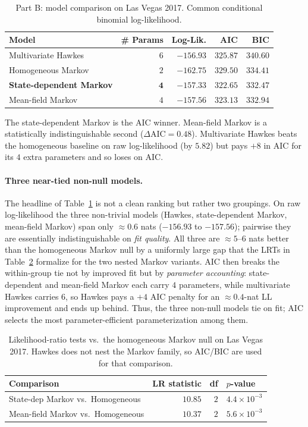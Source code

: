 \documentclass[11pt]{article}
\begin{document}
\begin{table}[H]
\centering
\caption{Part B: model comparison on Las Vegas 2017. Common conditional
binomial log-likelihood.}
\label{tab:partB-models}
\begin{tabular}{lrrrr}
\toprule
Model & \# Params & Log-Lik. & AIC & BIC \\
\midrule
Multivariate Hawkes        & $6$ & $-156.93$ & $325.87$ & $340.60$ \\
Homogeneous Markov         & $2$ & $-162.75$ & $329.50$ & $334.41$ \\
\textbf{State-dependent Markov} & $\mathbf{4}$ & $\mathbf{-157.33}$ & $\mathbf{322.65}$ & $\mathbf{332.47}$ \\
Mean-field Markov          & $4$ & $-157.56$ & $323.13$ & $332.94$ \\
\bottomrule
\end{tabular}
\end{table}

The state-dependent Markov is the AIC winner. Mean-field Markov is a
statistically indistinguishable second ($\Delta\mathrm{AIC}=0.48$).
Multivariate Hawkes beats the homogeneous baseline on raw log-likelihood
(by $5.82$) but pays $+8$ in AIC for its $4$ extra parameters and so loses
on AIC.

\paragraph{Three near-tied non-null models.}
The headline of Table~\ref{tab:partB-models} is not a clean ranking but
rather two groupings. On raw log-likelihood the three non-trivial models
(Hawkes, state-dependent Markov, mean-field Markov) span only
$\approx 0.6$ nats ($-156.93$ to $-157.56$); pairwise they are essentially
indistinguishable on \emph{fit quality}. All three are $\approx\!5\text{--}6$
nats better than the homogeneous Markov null by a uniformly large gap that
the LRTs in Table~\ref{tab:partB-LRT} formalize for the two nested Markov
variants. AIC then breaks the within-group tie not by improved fit but by
\emph{parameter accounting}: state-dependent and mean-field Markov each
carry $4$ parameters, while multivariate Hawkes carries $6$, so Hawkes pays
a $+4$ AIC penalty for an $\approx 0.4$-nat LL improvement and ends up
behind. Thus, the three non-null models tie on fit; AIC selects the most
parameter-efficient parameterization among them.

\begin{table}[H]
\centering
\caption{Likelihood-ratio tests vs.\ the homogeneous Markov null on
Las Vegas 2017. Hawkes does not nest the Markov family, so AIC/BIC are
used for that comparison.}
\label{tab:partB-LRT}
\begin{tabular}{lrrl}
\toprule
Comparison & LR statistic & df & $p$-value \\
\midrule
State-dep Markov vs.\ Homogeneous  & $10.85$ & $2$ & $4.4\times 10^{-3}$ \\
Mean-field Markov vs.\ Homogeneous & $10.37$ & $2$ & $5.6\times 10^{-3}$ \\
\bottomrule
\end{tabular}
\end{table}
\end{document}
